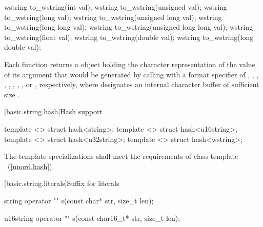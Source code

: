 %
\begin{itemdecl}
wstring to_wstring(int val);
wstring to_wstring(unsigned val);
wstring to_wstring(long val);
wstring to_wstring(unsigned long val);
wstring to_wstring(long long val);
wstring to_wstring(unsigned long long val);
wstring to_wstring(float val);
wstring to_wstring(double val);
wstring to_wstring(long double val);
\end{itemdecl}

\begin{itemdescr}
\pnum
\returns Each function returns a  object holding the character
representation of the value of its argument that would be generated by calling
 with a format specifier of
,
,
,
,
,
,
,
,
or , respectively, where  designates an
internal character buffer of sufficient size .
\end{itemdescr}

[basic.string.hash]{Hash support}

%
\begin{itemdecl}
template <> struct hash<string>;
template <> struct hash<u16string>;
template <> struct hash<u32string>;
template <> struct hash<wstring>;
\end{itemdecl}

\begin{itemdescr}
\pnum The template specializations shall meet the requirements of class template
~(\ref{unord.hash}).
\end{itemdescr}

[basic.string.literals]{Suffix for  literals}

\begin{itemdecl}
string operator "" s(const char* str, size_t len);
\end{itemdecl}

\begin{itemdescr}
\pnum
\returns
{}
\end{itemdescr}

\begin{itemdecl}
u16string operator "" s(const char16_t* str, size_t len);
\end{itemdecl}
\begin{itemdescr}
\pnum
\returns
{}
\end{itemdescr}

